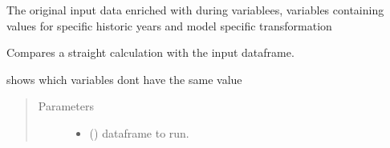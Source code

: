\documentclass[letterpaper,10pt,english]{sphinxmanual}
\begin{document}
\begin{fulllineitems}

\begin{fulllineitems}
\label{\detokenize{onboard/modelgrab:modelgrab.GrapWbModel.mfmsa_start_end}}
\pysigstartsignatures
{}
\pysigstopsignatures
\end{fulllineitems}


\begin{fulllineitems}
\label{\detokenize{onboard/modelgrab:modelgrab.GrapWbModel.dfmodel}}
\pysigstartsignatures
{}
\pysigstopsignatures
\sphinxAtStartPar
The original input data enriched with during variablees, variables containing
values for specific historic years and model specific transformation

\end{fulllineitems}


\begin{fulllineitems}
\label{\detokenize{onboard/modelgrab:modelgrab.GrapWbModel.test_model}}
\pysigstartsignatures
{}
\pysigstopsignatures
\sphinxAtStartPar
Compares a straight calculation with the input dataframe.

\sphinxAtStartPar
shows which variables dont have the same value
\begin{quote}\begin{description}
\item[{Parameters}] \leavevmode\begin{itemize}
\item {} 
\sphinxAtStartPar
{} () \textendash{} dataframe to run.


\end{itemize}
\end{description}
\end{quote}
\end{fulllineitems}
\end{fulllineitems}
\end{document}
